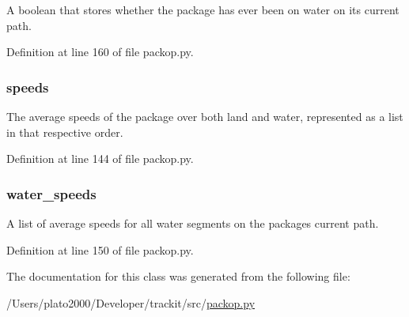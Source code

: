 A boolean that stores whether the package has ever been on water on its current path. 



Definition at line 160 of file packop.\+py.

\subsubsection[{\texorpdfstring{speeds}{speeds}}]{\setlength{\rightskip}{0pt plus 5cm}speeds}\hypertarget{classsrc_1_1packop_1_1_package_ad51ff69ce00ee5c869723c572db0eefd}{}\label{classsrc_1_1packop_1_1_package_ad51ff69ce00ee5c869723c572db0eefd}


The average speeds of the package over both land and water, represented as a list in that respective order. 



Definition at line 144 of file packop.\+py.

\subsubsection[{\texorpdfstring{water\+\_\+speeds}{water_speeds}}]{\setlength{\rightskip}{0pt plus 5cm}water\+\_\+speeds}\hypertarget{classsrc_1_1packop_1_1_package_a4fd9fe5f73cb34aa5b5c7029f024d4f6}{}\label{classsrc_1_1packop_1_1_package_a4fd9fe5f73cb34aa5b5c7029f024d4f6}


A list of average speeds for all water segments on the package\textquotesingle{}s current path. 



Definition at line 150 of file packop.\+py.



The documentation for this class was generated from the following file\+:\begin{DoxyCompactItemize}
\item 
/\+Users/plato2000/\+Developer/trackit/src/\hyperlink{packop_8py}{packop.\+py}\end{DoxyCompactItemize}
